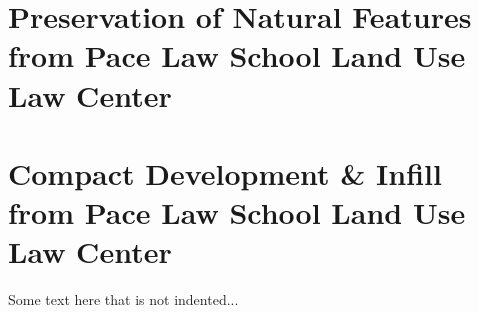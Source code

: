 \documentclass[11pt,fleqn, openany]{book} %
\begin{document}
\chapter{Preservation of Natural Features from Pace Law School Land Use Law 
Center}
\label{app:pres_natfeatures}

\chapter{Compact Development \& Infill from Pace Law School Land Use Law 
Center} 
\label{app:compact_development}

\noindent Some text here that is not indented...



\cleardoublepage
{}
\setlength{\columnsep}{0.75cm}
\printindex

\end{document}
